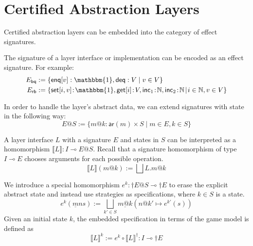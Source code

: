\documentclass[sigplan,10pt,review,anonymous]{acmart}
\newcommand{\kw}[1]{\ensuremath{ \mathsf{#1} }}
\begin{document}
\section{Certified Abstraction Layers}

Certified abstraction layers can be embedded into the category of effect
signatures.

The signature of a layer interface or implementation
can be encoded as an effect signature.
For example:
\begin{align*}
  E_\kw{bq} &:= \{
    \kw{enq}[v] : \mathbbm{1}, \kw{deq} : V \mid
    v \in V \} \\
  E_\kw{rb} &:= \{
    \kw{set}[i, v] \! : \! \mathbbm{1},
    \kw{get}[i] \! : \! V,
    \kw{inc}_1 \! : \! \mathbb{N},
    \kw{inc}_2 \! : \! \mathbb{N} \! \mid \!
    i \in \mathbb{N}, v \in V \}
\end{align*}

In order to handle the layer's abstract data,
we can extend signatures with state in the following way:
\[
  E@S :=
    \{ m@k : \kw{ar}(m) \times S \mid
       m \in E, k \in S \}
\]

A layer interface $L$ with a signature $E$
and states in $S$
can be interpreted as
a homomorphism $\llbracket L \rrbracket : I \multimap E@S$.
Recall that a signature homomorphism of type $I \multimap E$
chooses arguments for each possible operation.
\[
  \llbracket L \rrbracket (m@k) :=
    \bigsqcup L.m@k
\]

We introduce a special homomorphism $e^k : \dagger E@S \multimap \dagger E$
to erase the explicit abstract state and instead use
strategies as specifications, where $k \in S$
is a state.
\[
  e^k(\underline{m}ns) \mathrel{:=} \bigsqcup_{k'\in S} \underline{m@k}(n@k' \mapsto e^{k'}(s))
\]
Given an initial state $k$, the embedded specification
in terms of the game model is defined as
\[
  \llbracket L \rrbracket^k \mathrel{:=} e^k \circ \llbracket L \rrbracket^\dagger : I \multimap \dagger E
\]
\end{document}
